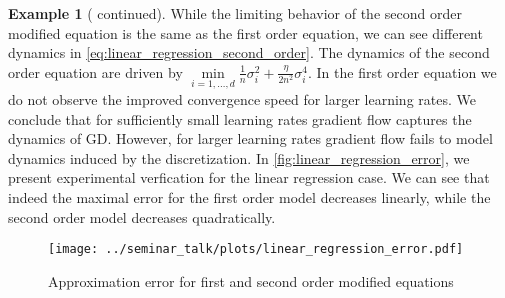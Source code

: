 \documentclass[12pt]{article}
\theoremstyle{definition}
\newtheorem{example}[example]{Example}
\numberwithin{equation}{section}
\newcommand{\T}{\mathsf{T}}
\newcommand{\norm}[1]{\lVert{#1}\rVert_2}
\newcommand{\defeq}{\vcentcolon=}
\DeclareMathOperator{\diag}{diag}
\begin{document}
\begin{example}[ continued]
  While the limiting behavior of the second order modified equation is the same as the first order equation, we can see different dynamics in \eqref{eq:linear_regression_second_order}. The dynamics of the second order equation are driven by $\min\limits_{i=1,\dots,d}\frac{1}{n}\sigma_i^2 + \frac{\eta}{2n^2}\sigma_i^4$. In the first order equation we do not observe the improved convergence speed for larger learning rates.
  We conclude that for sufficiently small learning rates gradient flow captures the dynamics of GD. However, for larger learning rates gradient flow fails to model dynamics induced by the discretization. In \autoref{fig:linear_regression_error}, we present experimental verfication for the linear regression case. We can see that indeed the maximal error for the first order model decreases linearly, while the second order model decreases quadratically.

  \begin{figure}[htb]
    \centering
    \texttt{[image: ../seminar\_talk/plots/linear\_regression\_error.pdf]}
    \caption{Approximation error for first and second order modified equations}
    \label{fig:linear_regression_error}
  \end{figure}
\end{example}
\end{document}
